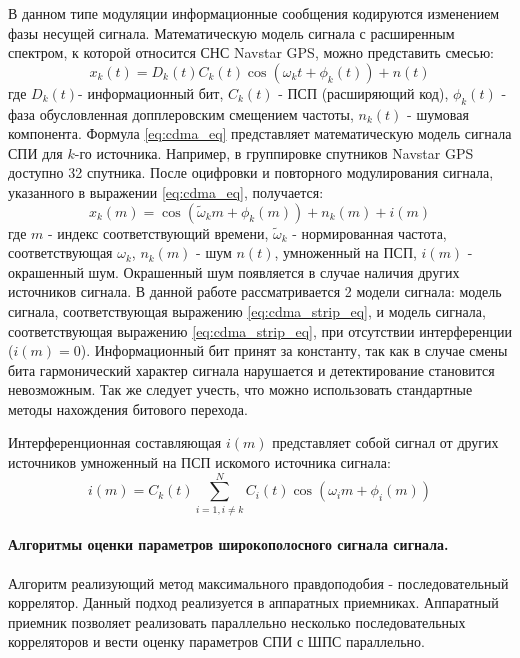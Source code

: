 В данном типе модуляции информационные сообщения кодируются изменением фазы несущей сигнала.
Математическую модель сигнала с расширенным спектром, к которой относится СНС Navstar GPS, можно представить смесью:
\begin{equation}
	\label{eq:cdma_eq}
	x_k(t)=D_k(t)C_k(t)\cos{(\omega_{k}t + \phi_k(t))} + n(t)
\end{equation}
где ${D_k}(t)$- информационный бит, ${C_k}(t)$ - ПСП (расширяющий код), ${\phi_k(t)}$ - фаза обусловленная допплеровским смещением частоты, 
${n_k(t)}$ - шумовая компонента. Формула  \ref{eq:cdma_eq} представляет математическую модель сигнала СПИ для ${k}$-го источника.
Например, в группировке спутников Navstar GPS доступно 32 спутника. После оцифровки и повторного модулирования сигнала, указанного в выражении \ref{eq:cdma_eq},
получается:
\begin{equation}
	\label{eq:cdma_strip_eq}
	x_k(m)=\cos{(\tilde{\omega}_{k}m + \phi_k(m))} + n_k(m) + i(m)
\end{equation}
где ${m}$ - индекс соответствующий времени, ${\tilde{\omega}_k}$ - нормированная частота, соответствующая ${\omega_k}$, ${n_k}(m)$ - шум ${n(t)}$, умноженный на ПСП,
${i(m)}$ - окрашенный шум. Окрашенный шум появляется в случае наличия других источников сигнала.
В данной работе рассматривается 2 модели сигнала: модель сигнала, соответствующая выражению \ref{eq:cdma_strip_eq}, и модель сигнала,
соответствующая выражению \ref{eq:cdma_strip_eq}, при отсутствии интерференции (${i(m)=0}$).
Информационный бит принят за константу, так как в случае смены бита гармонический характер сигнала нарушается и детектирование становится невозможным.
Так же следует учесть, что можно использовать стандартные методы нахождения битового перехода.

Интерференционная составляющая ${i(m)}$ представляет собой сигнал от других источников умноженный на ПСП искомого источника сигнала:
\begin{equation}
	\label{eq:cdma_interference}
	i(m) = C_k(t) \sum\limits_{i=1, i \ne k}^{N}C_i(t)\cos{(\omega_{i}m + \phi_i(m))}
\end{equation}

\paragraph{Алгоритмы оценки параметров широкополосного сигнала сигнала.}
Алгоритм реализующий метод максимального правдоподобия - последовательный коррелятор. Данный подход реализуется в аппаратных приемниках.
Аппаратный приемник позволяет реализовать параллельно несколько последовательных корреляторов и вести оценку параметров
СПИ с ШПС параллельно.

